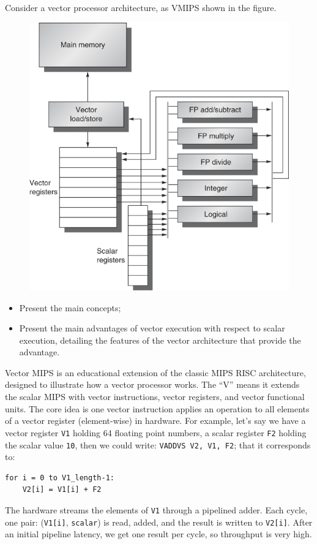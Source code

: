 Consider a vector processor architecture, as VMIPS shown in the figure.

\begin{figure}[!htp]
    \centering
    \includegraphics[width=.7\textwidth]{img/vmips.png}
\end{figure}
\begin{itemize}
    \item Present the main concepts;
    \item Present the main advantages of vector execution with respect to scalar execution, detailing the features of the vector architecture that provide the advantage.
\end{itemize}
\answer
\begin{deepeningbox}
    Vector MIPS is an educational extension of the classic MIPS RISC architecture, designed to illustrate how a vector processor works. The ``V'' means it extends the scalar MIPS with vector instructions, vector registers, and vector functional units. The core idea is one vector instruction applies an operation to all elements of a vector register (element-wise) in hardware. For example, let's say we have a vector register \texttt{V1} holding 64 floating point numbers, a scalar register \texttt{F2} holding the scalar value \texttt{10}, then we could write: \texttt{VADDVS V2, V1, F2}; that it corresponds to:
    \begin{lstlisting}[]
for i = 0 to V1_length-1:
    V2[i] = V1[i] + F2\end{lstlisting}
    The hardware streams the elements of \texttt{V1} through a pipelined adder. Each cycle, one pair: (\texttt{V1[i]}, \texttt{scalar}) is read, added, and the result is written to \texttt{V2[i]}. After an initial pipeline latency, we get one result per cycle, so throughput is very high.
\end{deepeningbox}

